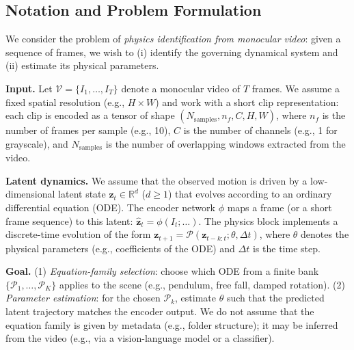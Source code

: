 
\subsection{Notation and Problem Formulation}
\label{sec:notation}

We consider the problem of \emph{physics identification from monocular video}: given a sequence of frames, we wish to (i) identify the governing dynamical system and (ii) estimate its physical parameters.

\textbf{Input.} Let $\mathcal{V} = \{I_1, \ldots, I_T\}$ denote a monocular video of $T$ frames. We assume a fixed spatial resolution (e.g., $H \times W$) and work with a short clip representation: each clip is encoded as a tensor of shape $(N_{\mathrm{samples}}, n_f, C, H, W)$, where $n_f$ is the number of frames per sample (e.g., 10), $C$ is the number of channels (e.g., 1 for grayscale), and $N_{\mathrm{samples}}$ is the number of overlapping windows extracted from the video.

\textbf{Latent dynamics.} We assume that the observed motion is driven by a low-dimensional latent state $\mathbf{z}_t \in \mathbb{R}^d$ ($d \geq 1$) that evolves according to an ordinary differential equation (ODE). The encoder network $\phi$ maps a frame (or a short frame sequence) to this latent: $\hat{\mathbf{z}}_t = \phi(I_t; \ldots)$. The physics block implements a discrete-time evolution of the form $\mathbf{z}_{t+1} = \mathcal{P}(\mathbf{z}_{t-k:t}; \theta, \Delta t)$, where $\theta$ denotes the physical parameters (e.g., coefficients of the ODE) and $\Delta t$ is the time step.

\textbf{Goal.} (1) \emph{Equation-family selection}: choose which ODE from a finite bank $\{\mathcal{P}_1, \ldots, \mathcal{P}_K\}$ applies to the scene (e.g., pendulum, free fall, damped rotation). (2) \emph{Parameter estimation}: for the chosen $\mathcal{P}_k$, estimate $\theta$ such that the predicted latent trajectory matches the encoder output. We do not assume that the equation family is given by metadata (e.g., folder structure); it may be inferred from the video (e.g., via a vision-language model or a classifier).


